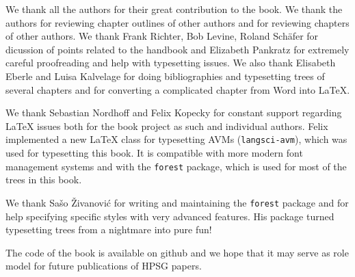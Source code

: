 \begin{refsection}
We thank all the authors for their great contribution to the book. We thank the authors for
reviewing chapter outlines of other authors and for reviewing chapters of other authors. We thank
Frank Richter, Bob Levine, Roland Schäfer for dicussion of points related to the handbook and
Elizabeth Pankratz for extremely careful proofreading and help with typesetting issues. We also
thank Elisabeth Eberle and Luisa Kalvelage for doing bibliographies and typesetting trees of several
chapters and for converting a complicated chapter from Word into \LaTeX.

We thank Sebastian Nordhoff and Felix Kopecky for constant support regarding \LaTeX{} issues both for
the book project as such and individual authors. Felix implemented a new \LaTeX{} class for
typesetting AVMs (\texttt{langsci-avm}), which was used for typesetting this book. It is compatible with more
modern font management systems and with the \texttt{forest} package, which is used for most of the trees in this book.

We thank Sašo Živanović for writing and maintaining the \texttt{forest} package and for help
specifying specific styles with very advanced features. His package turned typesetting trees from a
nightmare into pure fun!

The code of the book is available on github and we hope that it may serve as role model for future
publications of HPSG papers.


\printbibliography[heading=subbibliography]
\end{refsection}

